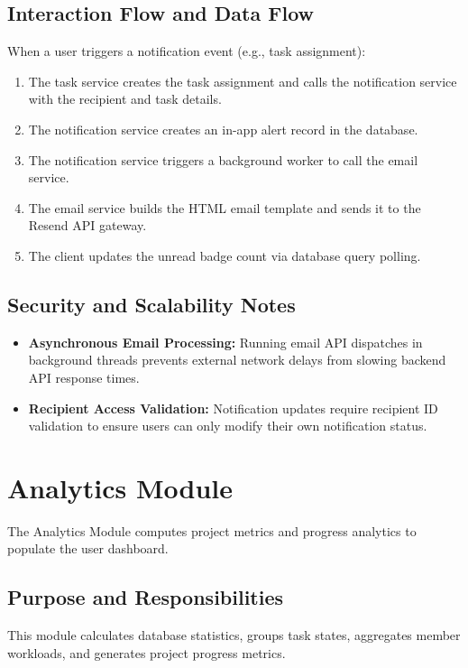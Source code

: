 \subsection{Interaction Flow and Data Flow}
When a user triggers a notification event (e.g., task assignment):
\begin{enumerate}
    \item The task service creates the task assignment and calls the notification service with the recipient and task details.
    \item The notification service creates an in-app alert record in the database.
    \item The notification service triggers a background worker to call the email service.
    \item The email service builds the HTML email template and sends it to the Resend API gateway.
    \item The client updates the unread badge count via database query polling.
\end{enumerate}

\subsection{Security and Scalability Notes}
\begin{itemize}
    \item \textbf{Asynchronous Email Processing:} Running email API dispatches in background threads prevents external network delays from slowing backend API response times.
    \item \textbf{Recipient Access Validation:} Notification updates require recipient ID validation to ensure users can only modify their own notification status.
\end{itemize}

\section{Analytics Module}
The Analytics Module computes project metrics and progress analytics to populate the user dashboard.

\subsection{Purpose and Responsibilities}
This module calculates database statistics, groups task states, aggregates member workloads, and generates project progress metrics.

